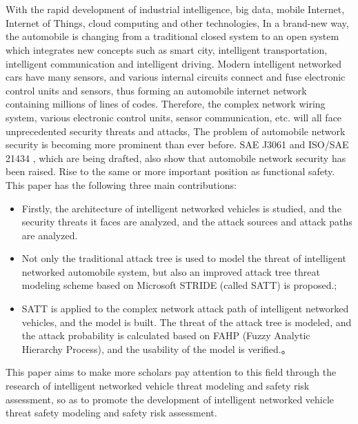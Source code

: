 \newpage
\vspace{-1cm}
\chapter*{\xiaosan {}}
\vspace{-0.5cm}
\hspace{-0.5cm}
With the rapid development of industrial intelligence, big data, mobile Internet, Internet of Things, cloud computing and other technologies,
In a brand-new way, the automobile is changing from a traditional closed system to an open system which integrates new concepts such as smart city, intelligent transportation, intelligent communication and intelligent driving.
Modern intelligent networked cars have many sensors, and various internal circuits connect and fuse electronic control units and sensors, thus forming an automobile internet network containing millions of lines of codes.
Therefore, the complex network wiring system, various electronic control units, sensor communication, etc. will all face unprecedented security threats and attacks,
The problem of automobile network security is becoming more prominent than ever before. SAE J3061 \cite{schmittner2016using} and ISO/SAE 21434 \cite{schneider2022iso}, which are being drafted, also show that automobile network security has been raised.
Rise to the same or more important position as functional safety.
This paper has the following three main contributions:
\begin{itemize}
    \item Firstly, the architecture of intelligent networked vehicles is studied, and the security threats it faces are analyzed, and the attack sources and attack paths are analyzed.
    \item Not only the traditional attack tree is used to model the threat of intelligent networked automobile system, but also an improved attack tree threat modeling scheme based on Microsoft STRIDE (called SATT) is proposed.;
    \item SATT is applied to the complex network attack path of intelligent networked vehicles, and the model is built. The threat of the attack tree is modeled, and the attack probability is calculated based on FAHP (Fuzzy Analytic Hierarchy Process), and the usability of the model is verified.。
  \end{itemize}
This paper aims to make more scholars pay attention to this field through the research of intelligent networked vehicle threat modeling and safety risk assessment, so as to promote the development of intelligent networked vehicle threat safety modeling and safety risk assessment.
